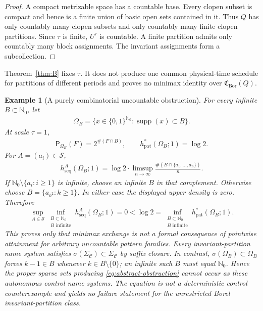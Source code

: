 \documentclass[11pt,reqno]{amsart}
\numberwithin{equation}{section}
\newtheorem{example}[theorem]{Example}
\theoremstyle{definition}
\newcommand{\Nzero}{\mathbb N_0}
\newcommand{\C}{\mathcal C}
\newcommand{\Patt}{\mathsf P}
\newcommand{\hseq}{h_{\mathrm{seq}}}
\newcommand{\hpat}{h_{\mathrm{pat}}^{*}}
\newcommand{\Bor}{\mathrm{Bor}}
\newcommand{\supp}{\operatorname{supp}}
\begin{document}
\begin{proof}
A compact metrizable space has a countable base.  Every clopen subset is
compact and hence is a finite union of basic open sets contained in it.  Thus
$Q$ has only countably many clopen subsets and only countably many finite
clopen partitions.  Since $\tau$ is finite, $U^\tau$ is countable.  A finite
partition admits only countably many block assignments.  The invariant assignments form a
subcollection.
\end{proof}

Theorem~\ref{thm:B} fixes $\tau$.  It does not produce one common
physical-time schedule for partitions of different periods and proves no
minimax identity over $\mathfrak C_{\Bor}(Q)$.

\begin{example}[A purely combinatorial uncountable obstruction]
\label{ex:uncountable}
For every infinite $B\subset\Nzero$, let
\begin{align*}
 \Omega_B=\{x\in\{0,1\}^{\Nzero}:\supp(x)\subset B\}.
\end{align*}
At scale $\tau=1$,
\begin{align*}
 \Patt_{\Omega_B}(F)=2^{\#(F\cap B)},
 \qquad \hpat(\Omega_B;1)=\log2.
\end{align*}
For $A=(a_i)\in\mathscr S$,
\begin{align*}
 \hseq^A(\Omega_B;1)
 =\log2\cdot\limsup_{n\to\infty}
 \frac{\#(B\cap\{a_1,\ldots,a_n\})}{n}.
\end{align*}
If $\Nzero\setminus\{a_i:i\ge1\}$ is infinite, choose an infinite $B$ in that
complement.  Otherwise choose $B=\{a_{k^2}:k\ge1\}$.  In either case the
displayed upper density is zero.  Therefore
\begin{equation}\label{eq:abstract-obstruction}
 \sup_{A\in\mathscr S}
 \inf_{\substack{B\subset\Nzero\\B\text{ infinite}}}
 \hseq^A(\Omega_B;1)=0
 <\log2
 =\inf_{\substack{B\subset\Nzero\\B\text{ infinite}}}
 \hpat(\Omega_B;1).
\end{equation}
This proves only that minimax exchange is not a formal consequence of
pointwise attainment for arbitrary uncountable pattern families.  Every
invariant-partition name system satisfies
$\sigma(\Sigma_\C)\subset\Sigma_\C$ by suffix closure.  In contrast,
$\sigma(\Omega_B)\subset\Omega_B$ forces $k-1\in B$ whenever
$k\in B\setminus\{0\}$; an infinite such $B$ must equal $\Nzero$.  Hence the
proper sparse sets producing \eqref{eq:abstract-obstruction} cannot occur as
these autonomous control name systems.  The equation is not a deterministic
control counterexample and yields no failure statement for the unrestricted
Borel invariant-partition class.
\end{example}
\end{document}
